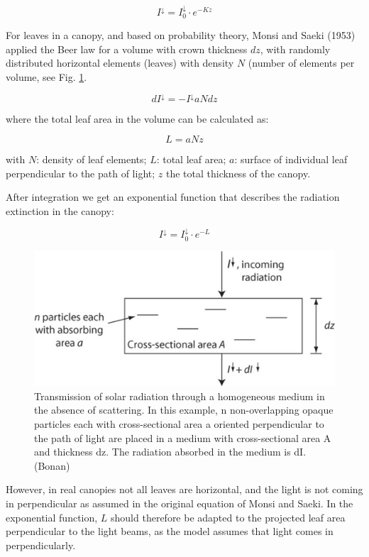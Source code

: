 \documentclass[
  12pt,
  oneside]{book}
\begin{document}
\[
I^{\downarrow} = I^{\downarrow}_0\cdot e^{-Kz}
\]

For leaves in a canopy, and based on probability theory, Monsi and Saeki (1953) applied the Beer law for a volume with crown thickness \(dz\), with randomly distributed horizontal elements (leaves) with density \(N\) (number of elements per volume, see Fig. \ref{fig:f39}.

\[
dI^{\downarrow} = - I^{\downarrow} a N dz
\]

where the total leaf area in the volume can be calculated as:

\[
L = aNz
\]

with \(N\): density of leaf elements; \(L\): total leaf area; \(a\): surface of individual leaf perpendicular to the path of light; \(z\) the total thickness of the canopy.

After integration we get an exponential function that describes the radiation extinction in the canopy:

\[
I^{\downarrow} = I^{\downarrow}_0\cdot e^{-L}
\]

\begin{figure}

{\centering \includegraphics[width=0.8\linewidth]{figures/chap3/f39_beer} 

}

\caption{Transmission of solar radiation through a homogeneous medium in the absence of scattering. In this example, n non-overlapping opaque particles each with cross-sectional area a oriented perpendicular to the path of light are placed in a medium with cross-sectional area A and thickness dz. The radiation absorbed in the medium is dI.(Bonan)}\label{fig:f39}
\end{figure}

However, in real canopies not all leaves are horizontal, and the light is not coming in perpendicular as assumed in the original equation of Monsi and Saeki. In the exponential function, \(L\) should therefore be adapted to the projected leaf area perpendicular to the light beams, as the model assumes that light comes in perpendicularly.
\end{document}

